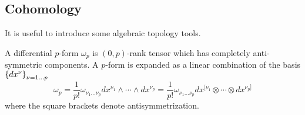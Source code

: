 %
%
%
%
%
%


\subsection{Cohomology}

It is useful to introduce some algebraic topology tools.

A differential $p$-form $\omega_p$ is $(0,p)$-rank tensor which has completely anti-symmetric components.
A $p$-form is expanded as a linear combination of the basis $\qty{dx^\nu}_{\nu=1\ldots p}$ 
\begin{equation}
  \omega_p =\frac{1}{p!} \omega_{\nu_1\ldots\nu_p}dx^{\nu_1}\wedge \cdots  \wedge dx^{\nu_p} =
\frac{1}{p!} \omega_{\nu_1\ldots\nu_p}dx^{[ \nu_1}\otimes \cdots  \otimes dx^{\nu_p]}
\end{equation}
where the square brackets denote antisymmetrization.

